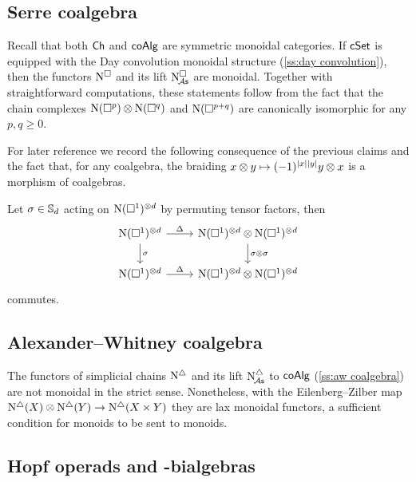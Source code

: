 \subsection{Serre coalgebra} \label{ss:serre coalgebra sym monoidal}

Recall that both $\Ch$ and $\coAlg$ are symmetric monoidal categories.
If $\cSet$ is equipped with the Day convolution monoidal structure (\cref{ss:day convolution}), then the functors $\cchains$ and its lift $\cchainsA$ are monoidal.
Together with straightforward computations, these statements follow from the fact that the chain complexes $\chains(\cube^p) \otimes \chains(\cube^q)$ and $\chains(\cube^{p+q})$ are canonically isomorphic for any $p, q \geq 0$.

For later reference we record the following consequence of the previous claims and the fact that, for any coalgebra, the braiding $x \otimes y \mapsto (-1)^{\bars{x} \bars{y}} y \otimes x$ is a morphism of coalgebras.

\begin{lemma} \label{l:serre diagonal invariant}
	Let $\sigma \in \S_d$ acting on $\chains(\cube^1)^{\otimes d}$ by permuting tensor factors, then
	\[
	\begin{tikzcd}
	\chains(\cube^1)^{\otimes d} \arrow[r, "\Delta"] \arrow[d, "\sigma"] &
	\chains(\cube^1)^{\otimes d} \otimes \chains(\cube^1)^{\otimes d} \arrow[d, "\sigma \otimes \sigma"] \\
	\chains(\cube^1)^{\otimes d} \arrow[r, "\Delta"] &
	\chains(\cube^1)^{\otimes d} \otimes \chains(\cube^1)^{\otimes d}
	\end{tikzcd}
	\]
	commutes.
\end{lemma}

\subsection{Alexander--Whitney coalgebra}

The functors of simplicial chains $\schains$ and its lift $\schainsA$ to $\coAlg$ (\cref{ss:aw coalgebra}) are not monoidal in the strict sense.
Nonetheless, with the Eilenberg--Zilber map $\schains(X) \otimes \schains(Y) \to \schains(X \times Y)$ they are lax monoidal functors, a sufficient condition for monoids to be sent to monoids.

\subsection{Hopf operads and \pdfEinfty-bialgebras}

